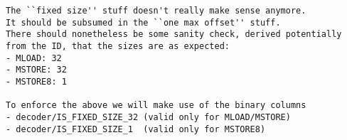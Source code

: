 % 

\saNote{}
\begin{verbatim}
The ``fixed size'' stuff doesn't really make sense anymore.
It should be subsumed in the ``one max offset'' stuff.
There should nonetheless be some sanity check, derived potentially from the ID, that the sizes are as expected:
- MLOAD: 32
- MSTORE: 32
- MSTORE8: 1

To enforce the above we will make use of the binary columns
- decoder/IS_FIXED_SIZE_32 (valid only for MLOAD/MSTORE)
- decoder/IS_FIXED_SIZE_1  (valid only for MSTORE8)
\end{verbatim}
